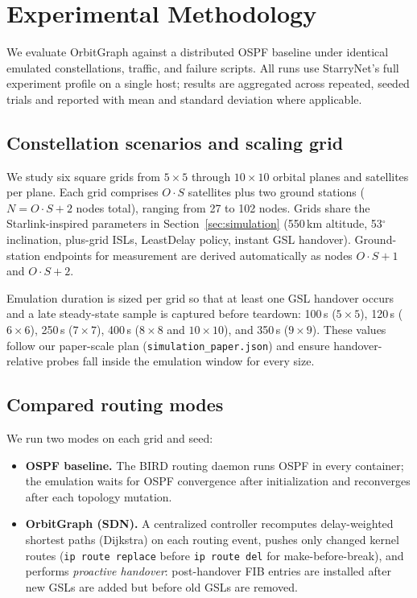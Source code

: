 
\section{Experimental Methodology}
\label{sec:experiments}

We evaluate OrbitGraph against a distributed OSPF baseline under identical
emulated constellations, traffic, and failure scripts.
All runs use StarryNet's full experiment profile on a single host; results are
aggregated across repeated, seeded trials and reported with mean and standard
deviation where applicable.

\subsection{Constellation scenarios and scaling grid}

We study six square grids from $5{\times}5$ through $10{\times}10$ orbital
planes and satellites per plane.
Each grid comprises $O \cdot S$ satellites plus two ground stations ($N = O
\cdot S + 2$ nodes total), ranging from 27 to 102 nodes.
Grids share the Starlink-inspired parameters in Section~\ref{sec:simulation}
(550\,km altitude, 53$^\circ$ inclination, plus-grid ISLs, LeastDelay policy,
instant GSL handover).
Ground-station endpoints for measurement are derived automatically as nodes
$O \cdot S + 1$ and $O \cdot S + 2$.

Emulation duration is sized per grid so that at least one GSL handover occurs
and a late steady-state sample is captured before teardown:
100\,s ($5{\times}5$), 120\,s ($6{\times}6$), 250\,s ($7{\times}7$),
400\,s ($8{\times}8$ and $10{\times}10$), and 350\,s ($9{\times}9$).
These values follow our paper-scale plan (\texttt{simulation\_paper.json}) and
ensure handover-relative probes fall inside the emulation window for every size.

\subsection{Compared routing modes}

We run two modes on each grid and seed:

\begin{itemize}
  \item \textbf{OSPF baseline.} The BIRD routing daemon runs OSPF in every
        container; the emulation waits for OSPF convergence after initialization
        and reconverges after each topology mutation.
  \item \textbf{OrbitGraph (SDN).} A centralized controller recomputes
        delay-weighted shortest paths (Dijkstra) on each routing event,
        pushes only changed kernel routes (\texttt{ip route replace} before
        \texttt{ip route del} for make-before-break), and performs
        \emph{proactive handover}: post-handover FIB entries are installed
        after new GSLs are added but before old GSLs are removed.
\end{itemize}

